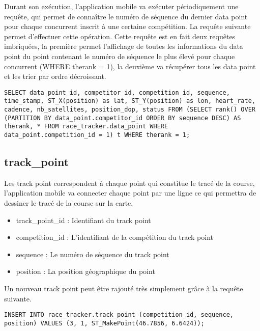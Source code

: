 Durant son exécution, l'application mobile va exécuter périodiquement une requête, qui permet de connaître le numéro de séquence du dernier data point pour chaque concurrent inscrit à une certaine compétition. La requête suivante permet d'effectuer cette opération. Cette requête est en fait deux requêtes imbriquées, la première permet l'affichage de toutes les informations du data point du point contenant le numéro de séquence le plus élevé pour chaque concurrent (WHERE therank = 1), la deuxième va récupérer tous les data point et les trier par ordre décroissant.

\begin{lstlisting}[style=SQLStyle]
SELECT data_point_id, competitor_id, competition_id, sequence, time_stamp, ST_X(position) as lat, ST_Y(position) as lon, heart_rate, cadence, nb_satellites, position_dop, status FROM (SELECT rank() OVER (PARTITION BY data_point.competitor_id ORDER BY sequence DESC) AS therank, * FROM race_tracker.data_point WHERE data_point.competition_id = 1) t WHERE therank = 1;
\end{lstlisting}

\subsection{track\_point}

Les track point correspondent à chaque point qui constitue le tracé de la course, l'application mobile va connecter chaque point par une ligne ce qui permettra de dessiner le tracé de la course sur la carte.

\begin{itemize}
\item track\_point\_id : Identifiant du track point
\item competition\_id : L'identifiant de la compétition du track point
\item sequence : Le numéro de séquence du track point
\item position : La position géographique du point
\end{itemize}

Un nouveau track point peut être rajouté très simplement grâce à la requête suivante.

\begin{lstlisting}[style=SQLStyle]
INSERT INTO race_tracker.track_point (competition_id, sequence, position) VALUES (3, 1, ST_MakePoint(46.7856, 6.6424));
\end{lstlisting}
